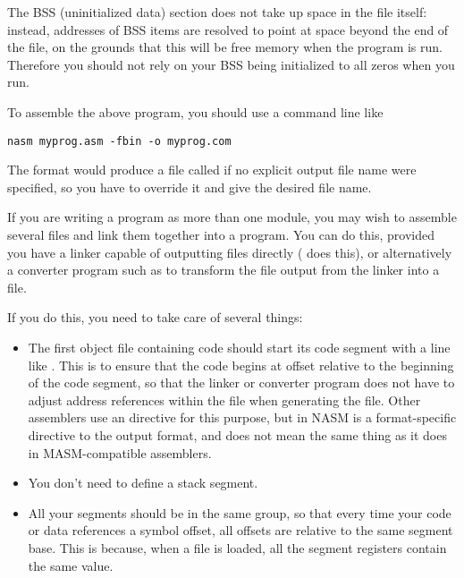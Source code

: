 The BSS (uninitialized data) section does not take up space in the
 file itself: instead, addresses of BSS items are resolved
to point at space beyond the end of the file, on the grounds that
this will be free memory when the program is run. Therefore you
should not rely on your BSS being initialized to all zeros when you
run.

To assemble the above program, you should use a command line like

\begin{lstlisting}
nasm myprog.asm -fbin -o myprog.com
\end{lstlisting}

The  format would produce a file called  if no
explicit output file name were specified, so you have to override it
and give the desired file name.


If you are writing a  program as more than one module, you
may wish to assemble several  files and link them together
into a  program. You can do this, provided you have a linker
capable of outputting  files directly ( does this),
or alternatively a converter program such as  to
transform the  file output from the linker into a 
file.

If you do this, you need to take care of several things:

\begin{itemize}
    \item{The first object file containing code should start its code
        segment with a line like . This is to ensure
        that the code begins at offset  relative to the beginning
        of the code segment, so that the linker or converter program does
        not have to adjust address references within the file when generating
        the  file. Other assemblers use an  directive
        for this purpose, but  in NASM is a format-specific directive
        to the  output format, and does not mean the same thing as
        it does in MASM-compatible assemblers.}
    \item{You don't need to define a stack segment.}
    \item{All your segments should be in the same group, so that every time
        your code or data references a symbol offset, all offsets are
        relative to the same segment base. This is because, when a 
        file is loaded, all the segment registers contain the same value.}
\end{itemize}

